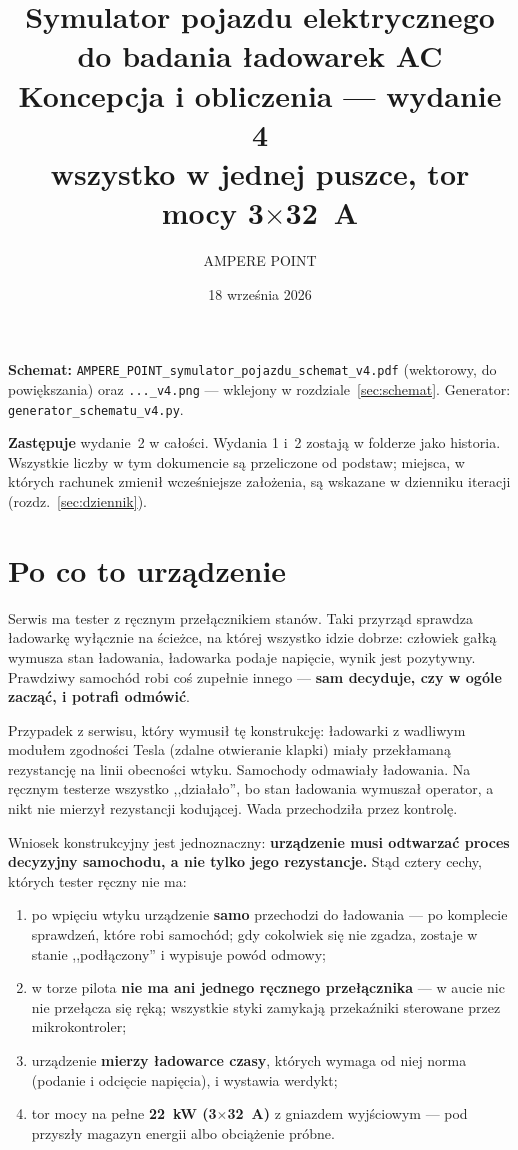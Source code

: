 \documentclass[a4paper,11pt]{article}
\title{\vspace{-1.5cm}Symulator pojazdu elektrycznego do badania ładowarek AC\\[2mm]
\large Koncepcja i obliczenia --- wydanie 4\\[1mm]
\normalsize wszystko w jednej puszce, tor mocy 3$\times$32~A}
\author{AMPERE POINT}
\date{18 września 2026}
\begin{document}
\maketitle
\thispagestyle{empty}

\noindent\textbf{Schemat:} \texttt{AMPERE\_POINT\_symulator\_pojazdu\_schemat\_v4.pdf}
(wektorowy, do powiększania) oraz \texttt{...\_v4.png} --- wklejony w rozdziale~\ref{sec:schemat}.
Generator: \texttt{generator\_schematu\_v4.py}.

\noindent\textbf{Zastępuje} wydanie~2 w całości. Wydania 1 i~2 zostają w folderze jako historia.
Wszystkie liczby w tym dokumencie są przeliczone od podstaw; miejsca, w których rachunek
zmienił wcześniejsze założenia, są wskazane w dzienniku iteracji (rozdz.~\ref{sec:dziennik}).

\tableofcontents

\section{Po co to urządzenie}

Serwis ma tester z ręcznym przełącznikiem stanów. Taki przyrząd sprawdza ładowarkę
wyłącznie na ścieżce, na której wszystko idzie dobrze: człowiek gałką wymusza stan
ładowania, ładowarka podaje napięcie, wynik jest pozytywny. Prawdziwy samochód robi
coś zupełnie innego --- \textbf{sam decyduje, czy w ogóle zacząć, i potrafi odmówić}.

Przypadek z serwisu, który wymusił tę konstrukcję: ładowarki z wadliwym modułem
zgodności Tesla (zdalne otwieranie klapki) miały przekłamaną rezystancję na linii
obecności wtyku. Samochody odmawiały ładowania. Na ręcznym testerze wszystko
,,działało'', bo stan ładowania wymuszał operator, a nikt nie mierzył rezystancji
kodującej. Wada przechodziła przez kontrolę.

Wniosek konstrukcyjny jest jednoznaczny: \textbf{urządzenie musi odtwarzać proces
decyzyjny samochodu, a nie tylko jego rezystancje.} Stąd cztery cechy, których
tester ręczny nie ma:

\begin{enumerate}
\item po wpięciu wtyku urządzenie \textbf{samo} przechodzi do ładowania --- po
      komplecie sprawdzeń, które robi samochód; gdy cokolwiek się nie zgadza,
      zostaje w stanie ,,podłączony'' i wypisuje powód odmowy;
\item w torze pilota \textbf{nie ma ani jednego ręcznego przełącznika} --- w aucie
      nic nie przełącza się ręką; wszystkie styki zamykają przekaźniki sterowane
      przez mikrokontroler;
\item urządzenie \textbf{mierzy ładowarce czasy}, których wymaga od niej norma
      (podanie i odcięcie napięcia), i wystawia werdykt;
\item tor mocy na pełne \textbf{22~kW (3$\times$32~A)} z gniazdem wyjściowym ---
      pod przyszły magazyn energii albo obciążenie próbne.
\end{enumerate}
\end{document}

